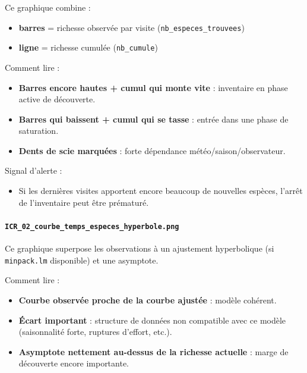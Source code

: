 Ce graphique combine :

\begin{itemize}
\tightlist
\item
  \textbf{barres} = richesse observée par visite
  (\texttt{nb\_especes\_trouvees})
\item
  \textbf{ligne} = richesse cumulée (\texttt{nb\_cumule})
\end{itemize}

Comment lire :

\begin{itemize}
\tightlist
\item
  \textbf{Barres encore hautes + cumul qui monte vite} : inventaire en
  phase active de découverte.
\item
  \textbf{Barres qui baissent + cumul qui se tasse} : entrée dans une
  phase de saturation.
\item
  \textbf{Dents de scie marquées} : forte dépendance
  météo/saison/observateur.
\end{itemize}

Signal d'alerte :

\begin{itemize}
\tightlist
\item
  Si les dernières visites apportent encore beaucoup de nouvelles
  espèces, l'arrêt de l'inventaire peut être prématuré.
\end{itemize}

\paragraph{\texorpdfstring{\texttt{ICR\_02\_courbe\_temps\_especes\_hyperbole.png}}{ICR\_02\_courbe\_temps\_especes\_hyperbole.png}}\label{icr_02_courbe_temps_especes_hyperbole.png}

Ce graphique superpose les observations à un ajustement hyperbolique (si
\texttt{minpack.lm} disponible) et une asymptote.

Comment lire :

\begin{itemize}
\tightlist
\item
  \textbf{Courbe observée proche de la courbe ajustée} : modèle
  cohérent.
\item
  \textbf{Écart important} : structure de données non compatible avec ce
  modèle (saisonnalité forte, ruptures d'effort, etc.).
\item
  \textbf{Asymptote nettement au-dessus de la richesse actuelle} : marge
  de découverte encore importante.
\end{itemize}


